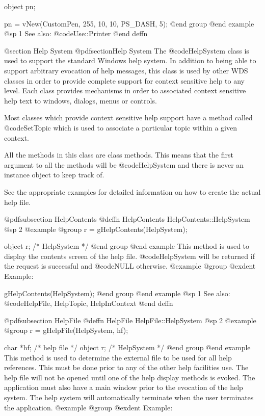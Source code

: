 object  pn;

pn = vNew(CustomPen, 255, 10, 10, PS_DASH, 5);
@end group
@end example
@sp 1
See also:  @code{Use::Printer}
@end deffn




@section Help System
@pdfsection{Help System}
The @code{HelpSystem} class is used to support the standard Windows
help system.  In addition to being able to support arbitrary evocation
of help messages, this class is used by other WDS classes in order to
provide complete support for context sensitive help to any level.
Each class provides mechanisms in order to associated context sensitive
help text to windows, dialogs, menus or controls.

Most classes which provide context sensitive help support have a method
called @code{SetTopic} which is used to associate a particular topic
within a given context.

All the methods in this class are class methods.  This means that
the first argument to all the methods will be @code{HelpSystem} and
there is never an instance object to keep track of.

See the appropriate examples for detailed information on how to
create the actual help file.











@pdfsubsection {HelpContents}
@deffn {HelpContents} HelpContents::HelpSystem
@sp 2
@example
@group
r = gHelpContents(HelpSystem);

object  r;      /*  HelpSystem  */
@end group
@end example
This method is used to display the contents screen of the help file.
@code{HelpSystem} will be returned if the request is successful and
@code{NULL} otherwise.
@example
@group
@exdent Example:

gHelpContents(HelpSystem);
@end group
@end example
@sp 1
See also:  @code{HelpFile, HelpTopic, HelpInContext}
@end deffn















@pdfsubsection {HelpFile}
@deffn {HelpFile} HelpFile::HelpSystem
@sp 2
@example
@group
r = gHelpFile(HelpSystem, hf);

char    *hf;    /*  help file   */
object  r;      /*  HelpSystem  */
@end group
@end example
This method is used to determine the external file to be used for all help
references.  This must be done prior to any of the other help facilities
use.  The help file will not be opened until one of the help display
methods is evoked.  The application must also have a main window prior
to the evocation of the help system.  The help system will automatically
terminate when the user terminates the application.
@example
@group
@exdent Example:

